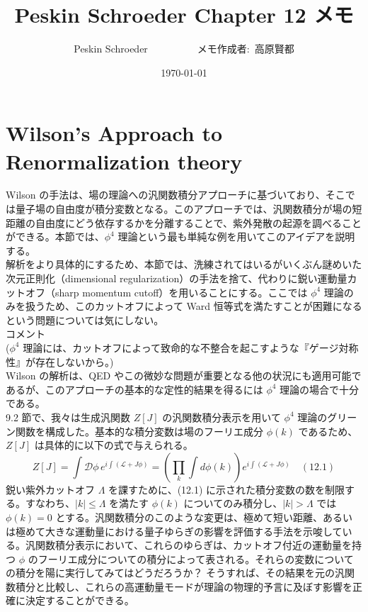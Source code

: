\documentclass[uplatex,dvipdfmx]{jsarticle}
\begin{document}
\title{Peskin Schroeder Chapter 12 メモ}
\author{Peskin Schroeder~~~~~~~~~~メモ作成者:~高原賢都}
\date{\today}
\maketitle
\section{Wilson's Approach to Renormalization theory}
Wilson の手法は、場の理論への汎関数積分アプローチに基づいており、そこでは量子場の自由度が積分変数となる。このアプローチでは、汎関数積分が場の短距離の自由度にどう依存するかを分離することで、紫外発散の起源を調べることができる。本節では、$\phi^4$ 理論という最も単純な例を用いてこのアイデアを説明する。\\
解析をより具体的にするため、本節では、洗練されてはいるがいくぶん謎めいた次元正則化（dimensional regularization）の手法を捨て、代わりに鋭い運動量カットオフ（sharp momentum cutoff）を用いることにする。ここでは $\phi^4$ 理論のみを扱うため、このカットオフによって Ward 恒等式を満たすことが困難になるという問題については気にしない。\\
コメント\\
($\phi^4$ 理論には、カットオフによって致命的な不整合を起こすような『ゲージ対称性』が存在しないから。)\\
Wilson の解析は、QED やこの微妙な問題が重要となる他の状況にも適用可能であるが、このアプローチの基本的な定性的結果を得るには $\phi^4$ 理論の場合で十分である。\\
9.2 節で、我々は生成汎関数 $Z[J]$ の汎関数積分表示を用いて $\phi^4$ 理論のグリーン関数を構成した。基本的な積分変数は場のフーリエ成分 $\phi(k)$ であるため、$Z[J]$ は具体的に以下の式で与えられる。
\begin{equation}
    Z[J] = \int \mathcal{D}\phi \, e^{i \int (\mathcal{L} + J\phi)} = \left( \prod_k \int d\phi(k) \right) e^{i \int (\mathcal{L} + J\phi)} \quad (12.1)
\end{equation}
鋭い紫外カットオフ $\Lambda$ を課すために、(12.1) に示された積分変数の数を制限する。すなわち、$|k| \le \Lambda$ を満たす $\phi(k)$ についてのみ積分し、$|k| > \Lambda$ では $\phi(k) = 0$ とする。汎関数積分のこのような変更は、極めて短い距離、あるいは極めて大きな運動量における量子ゆらぎの影響を評価する手法を示唆している。汎関数積分表示において、これらのゆらぎは、カットオフ付近の運動量を持つ $\phi$ のフーリエ成分についての積分によって表される。それらの変数についての積分を陽に実行してみてはどうだろうか？ そうすれば、その結果を元の汎関数積分と比較し、これらの高運動量モードが理論の物理的予言に及ぼす影響を正確に決定することができる。\\
\end{document}
